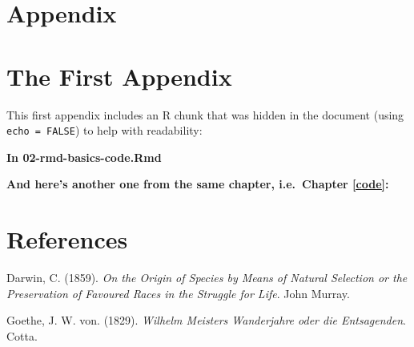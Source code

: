 \documentclass[a4paper, nobind]{templates/ociamthesis}
\newlength{\cslhangindent}
\newenvironment{CSLReferences}[2] %
 {%
  \setlength{\parindent}{0pt}
  \ifodd #1
  \let\oldpar\par
  \def\par{\hangindent=\cslhangindent\oldpar}
  \fi
  \setlength{\parskip}{1mm}
  \setlength{\baselineskip}{6mm}
 }%
 {}
\begin{document}
\hypertarget{appendix}{%
\chapter*{Appendix}\label{appendix}}

\startappendices

\hypertarget{the-first-appendix}{%
\chapter{The First Appendix}\label{the-first-appendix}}

This first appendix includes an R chunk that was hidden in the document (using \texttt{echo\ =\ FALSE}) to help with readability:

\textbf{In 02-rmd-basics-code.Rmd}

\textbf{And here's another one from the same chapter, i.e.~Chapter \ref{code}:}

\hypertarget{references}{%
\chapter*{References}\label{references}}


\hypertarget{refs}{}
\begin{CSLReferences}{1}{0}
\leavevmode{}%
Darwin, C. (1859). \emph{{On the Origin of Species by Means of Natural Selection or the Preservation of Favoured Races in the Struggle for Life}}. John Murray.

\leavevmode{}%
Goethe, J. W. von. (1829). \emph{Wilhelm {Meisters} {Wanderjahre} oder die {Entsagenden}}. Cotta.

\end{CSLReferences}

\end{document}
